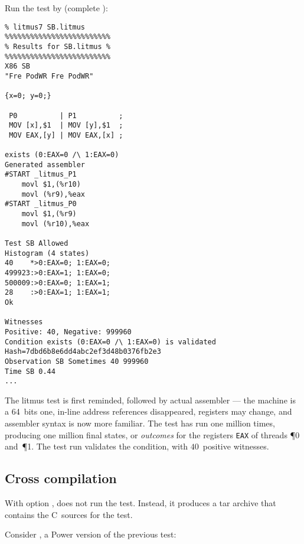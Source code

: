 \label{x86:classic}Run the test by\ifhevea{}
(complete )\fi:
\begin{verbatim}
% litmus7 SB.litmus
%%%%%%%%%%%%%%%%%%%%%%%%%
% Results for SB.litmus %
%%%%%%%%%%%%%%%%%%%%%%%%%
X86 SB
"Fre PodWR Fre PodWR"

{x=0; y=0;}

 P0          | P1          ;
 MOV [x],$1  | MOV [y],$1  ;
 MOV EAX,[y] | MOV EAX,[x] ;

exists (0:EAX=0 /\ 1:EAX=0)
Generated assembler
#START _litmus_P1
	movl $1,(%r10)
	movl (%r9),%eax
#START _litmus_P0
	movl $1,(%r9)
	movl (%r10),%eax

Test SB Allowed
Histogram (4 states)
40    *>0:EAX=0; 1:EAX=0;
499923:>0:EAX=1; 1:EAX=0;
500009:>0:EAX=0; 1:EAX=1;
28    :>0:EAX=1; 1:EAX=1;
Ok

Witnesses
Positive: 40, Negative: 999960
Condition exists (0:EAX=0 /\ 1:EAX=0) is validated
Hash=7dbd6b8e6dd4abc2ef3d48b0376fb2e3
Observation SB Sometimes 40 999960
Time SB 0.44
...
\end{verbatim}
The  litmus test is first reminded, followed by actual assembler
--- the machine is a 64~bits one, in-line address references disappeared,
registers may change, and assembler syntax is now more familiar.
The test has run one million times, producing one million final states,
or \emph{outcomes} for the registers \verb+EAX+ of threads \P{0} and~\P{1}.
The test run validates the condition, with $40$~positive witnesses.



\subsection{Cross\label{cross} compilation}

With option , \litmus{} does not run the test.
Instead, it produces a tar archive that contains the C~sources for
the test.

Consider , a Power version
of the previous test:




